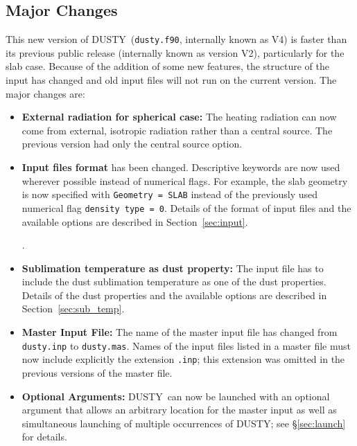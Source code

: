 \documentclass[11pt]{article}
\def\D    {{\sf DUSTY}}
\begin{document}
\subsection{Major Changes}
\label{sec:major_changes}

This new version of \D\ ({\tt dusty.f90}, internally known as V4) is faster than its previous
public release (internally known as version V2), particularly for the slab case. Because
of the addition of some new features, the structure of the input has
changed and old input files will not run on the current version. The
major changes are:
%
\begin{itemize}
\item {\bf External radiation for spherical case:} The heating
  radiation can now come from external, isotropic radiation rather
  than a central source. The previous version had only the central
  source option.
\item {\bf Input files format} has been changed. Descriptive keywords
  are now used wherever possible instead of numerical flags. For
  example, the slab geometry is now specified with \hbox{\tt Geometry
    = SLAB} instead of the previously used numerical flag {\tt density
    type = 0}. Details of the format of input files and the available
  options are described in Section~\ref{sec:input}.

  .

\item {\bf Sublimation temperature as dust property:} The input file
  has to include the dust sublimation temperature as one of the dust
  properties.  Details of the dust properties and the available
  options are described in Section~\ref{sec:sub_temp}.

\item {\bf Master Input File:} The name of the master input file has
  changed from {\tt dusty.inp} to {\tt dusty.mas}. Names of the input
  files listed in a master file must now include explicitly the
  extension {\tt .inp}; this extension was omitted in the previous
  versions of the master file.

\item {\bf Optional Arguments:} \D\ can now be launched with an
  optional argument that allows an arbitrary location for the master
  input as well as simultaneous launching of multiple occurrences of
  \D; see \S\ref{sec:launch} for details.

\end{itemize}
\end{document}
